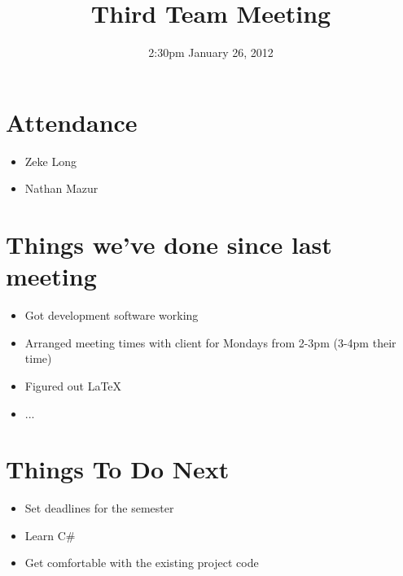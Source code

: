 \documentclass{article}
\begin{document}
\title{Third Team Meeting}
\date{2:30pm January 26, 2012}
\maketitle

\section{Attendance}
\begin{itemize}
\item Zeke Long
\item Nathan Mazur
\end{itemize}

\section{Things we've done since last meeting}
\begin{itemize}
\item Got development software working
\item Arranged meeting times with client for Mondays from 2-3pm (3-4pm their time)
\item Figured out LaTeX
\item ...
\end{itemize}

\section{Things To Do Next}
\begin{itemize}
\item Set deadlines for the semester
\item Learn C\#
\item Get comfortable with the existing project code
\end{itemize}
\end{document}
